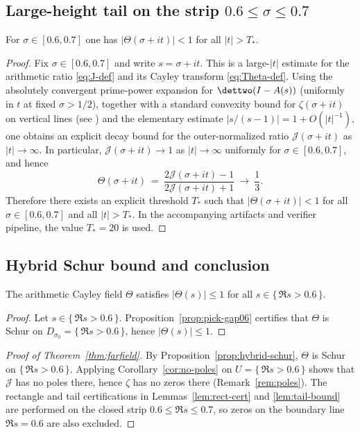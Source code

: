 \documentclass[11pt]{article}
\begin{document}
\subsection*{Large-height tail on the strip \texorpdfstring{$0.6\le\sigma\le 0.7$}{0.6<=sigma<=0.7}}
\begin{lemma}\label{lem:tail-bound}
For $\sigma\in[0.6,0.7]$ one has $|\Theta(\sigma+it)|<1$ for all $|t|>T_\ast$.
\end{lemma}
\begin{proof}
Fix $\sigma\in[0.6,0.7]$ and write $s=\sigma+it$.
This is a large-$|t|$ estimate for the arithmetic ratio \eqref{eq:J-def} and its Cayley transform \eqref{eq:Theta-def}.
Using the absolutely convergent prime-power expansion for $\dettwo(I-A(s))$ (uniformly in $t$ at fixed $\sigma>1/2$), together with a standard convexity bound for $\zeta(\sigma+it)$ on vertical lines (see \cite{Titchmarsh,MV}) and the elementary estimate $|s/(s-1)|=1+O(|t|^{-1})$, one obtains an explicit decay bound for the outer-normalized ratio $\mathcal J(\sigma+it)$ as $|t|\to\infty$.
In particular, $\mathcal J(\sigma+it)\to 1$ as $|t|\to\infty$ uniformly for $\sigma\in[0.6,0.7]$, and hence
\[
  \Theta(\sigma+it)\ =\ \frac{2\mathcal J(\sigma+it)-1}{2\mathcal J(\sigma+it)+1}\ \longrightarrow\ \frac13.
\]
Therefore there exists an explicit threshold $T_\ast$ such that $|\Theta(\sigma+it)|<1$ for all $\sigma\in[0.6,0.7]$ and all $|t|>T_\ast$.
In the accompanying artifacts and verifier pipeline, the value $T_\ast=20$ is used.
\end{proof}

\subsection*{Hybrid Schur bound and conclusion}
\begin{proposition}\label{prop:hybrid-schur}
The arithmetic Cayley field $\Theta$ satisfies $|\Theta(s)|\le 1$ for all $s\in\{\,\Re s>0.6\,\}$.
\end{proposition}
\begin{proof}
Let $s\in\{\,\Re s>0.6\,\}$.
Proposition~\ref{prop:pick-gap06} certifies that $\Theta$ is Schur on $D_{\sigma_0}=\{\,\Re s>0.6\,\}$, hence $|\Theta(s)|\le 1$.
\end{proof}

\begin{proof}[Proof of Theorem~\ref{thm:farfield}]
By Proposition~\ref{prop:hybrid-schur}, $\Theta$ is Schur on $\{\,\Re s>0.6\,\}$.
Applying Corollary~\ref{cor:no-poles} on $U=\{\,\Re s>0.6\,\}$ shows that $\mathcal J$ has no poles there, hence $\zeta$ has no zeros there (Remark~\ref{rem:poles}).
The rectangle and tail certifications in Lemmas~\ref{lem:rect-cert} and \ref{lem:tail-bound} are performed on the closed strip $0.6\le \Re s\le 0.7$, so zeros on the boundary line $\Re s=0.6$ are also excluded.
\end{proof}
\end{document}
